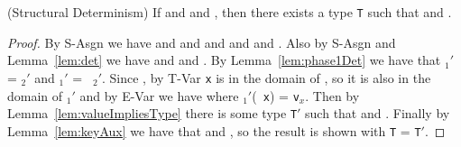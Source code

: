 \begin{Theorem} (Structural Determinism)
  If
  \emph{} and
  \emph{} 
  and \emph{}, then there exists a type {\tt T}
  such that
\emph{} and
\emph{}.
\end{Theorem}
\begin{proof}
By {\sc S-Asgn} we have      
and  and
 and
 and
     and
.
Also by {\sc S-Asgn} and Lemma~\ref{lem:det}
we have
 and
     and
.
By Lemma~\ref{lem:phase1Det} we have that  {\tt \Euid$_1'$} = {\tt \Euid$_2'$} and {\tt \Huid$_1'$} = {\tt
  \Huid$_2'$}.  Since , by {\sc
  T-Var} {\tt x} is in the domain of {\tt \Euid}, so it is also in
the domain of {\tt \Euid$_1'$} and by {\sc E-Var} we have
 where {\tt \Euid$_1'$}({\tt
  x}) = {\tt v$_x$}.
Then by Lemma~\ref{lem:valueImpliesType} there is some type {\tt T$'$}
such that  
and .  Finally by
Lemma~\ref{lem:keyAux} we have that  and
, so the result is shown with {\tt T} =
{\tt T$'$}.

\end{proof}


